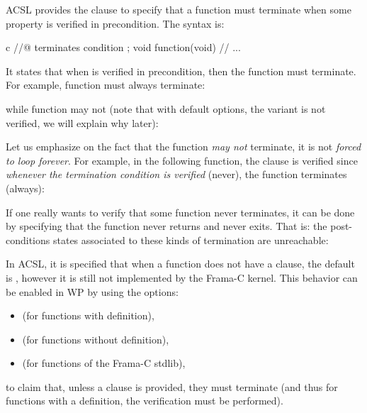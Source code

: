 ACSL provides the  clause to specify that a function must
terminate when some property is verified in precondition. The syntax is:


\begin{CodeBlock}{c}
//@ terminates condition ;
void function(void){
  // ...
}
\end{CodeBlock}


It states that when  is verified in precondition, then
the function must terminate. For example, function  must always
terminate:




while function  may not (note that with default options,
the variant is not verified, we will explain why later):




Let us emphasize on the fact that the function {\em may not} terminate, it is
not {\em forced to loop forever}. For example, in the following function, the
 clause is verified since
{\em whenever the termination condition is verified} (never), the function
terminates (always):




\begin{Information}
  If one really wants to verify that some function never terminates, it can be
  done by specifying that the function never returns and never exits. That is:
  the post-conditions states associated to these kinds of termination are
  unreachable:
\end{Information}


\begin{Information}
  In ACSL, it is specified that when a function does not have a
   clause, the default is
  , however it is still not
  implemented by the Frama-C kernel. This behavior can be enabled in WP
  by using the options:
  \begin{itemize}
  \item {} (for functions with definition),
  \item {} (for functions without definition),
  \item {} (for functions of the Frama-C stdlib),
  \end{itemize}
  to claim that, unless a clause is provided, they must terminate (and thus
  for functions with a definition, the verification must be performed).
\end{Information}


